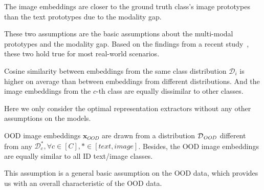 \begin{assumption}\label{ass: modality gap}
The image embeddings are closer to the ground truth class's image prototypes than the text prototypes due to the modality gap.
\end{assumption}

\begin{remark}
    These two assumptions are the basic assumptions about the multi-modal prototypes and the modality gap. 
    Based on the findings from a recent study~\cite{liang2022mind}, these two hold true for most real-world scenarios.
\end{remark}

\begin{assumption}\label{ass: well trained}
Cosine similarity between embeddings from the same class distribution $\mathcal{D}_i$ is higher on average than between embeddings from different distributions. 
And the image embeddings from the $c$-th class are equally dissimilar to other classes.
\end{assumption}

\begin{remark}
    Here we only consider the optimal representation extractors without any other assumptions on the models.
\end{remark}

\begin{assumption}\label{ass: OOD condition}
OOD image embeddings $\mathbf{x}_{\textit{OOD}}$ are drawn from a distribution $\mathcal{D}_{\text{\textit{OOD}}}$ different from any $\mathcal{D}_c^{*}, \forall c \in [C], * \in [\textit{text}, \textit{image}]$. 
Besides, the OOD image embeddings are equally similar to all ID text/image classes.
\end{assumption}

\begin{remark}
    This assumption is a general basic assumption on the OOD data, which provides us with an overall characteristic of the OOD data.
\end{remark}

